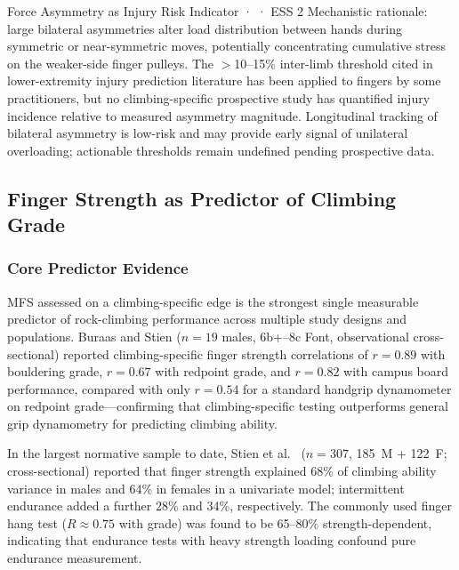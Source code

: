 \begin{bioplausbox}{Force Asymmetry as Injury Risk Indicator · \bioplausible · ESS 2}
Mechanistic rationale: large bilateral asymmetries alter load distribution between hands during symmetric or near-symmetric moves, potentially concentrating cumulative stress on the weaker-side finger pulleys.
The $>$10--15\% inter-limb threshold cited in lower-extremity injury prediction literature has been applied to fingers by some practitioners, but no climbing-specific prospective study has quantified injury incidence relative to measured asymmetry magnitude.
Longitudinal tracking of bilateral asymmetry is low-risk and may provide early signal of unilateral overloading; actionable thresholds remain undefined pending prospective data.
\end{bioplausbox}

\subsection{Finger Strength as Predictor of Climbing Grade}
\label{sec:mfspredictor}

\subsubsection{Core Predictor Evidence}

MFS assessed on a climbing-specific edge is the strongest single measurable predictor of rock-climbing performance across multiple study designs and populations. Buraas and Stien \cite{BBW25} ($n = 19$ males, 6b+--8c Font, observational cross-sectional) reported climbing-specific finger strength correlations of $r = 0.89$ with bouldering grade, $r = 0.67$ with redpoint grade, and $r = 0.82$ with campus board performance, compared with only $r = 0.54$ for a standard handgrip dynamometer on redpoint grade---confirming that climbing-specific testing outperforms general grip dynamometry for predicting climbing ability.

In the largest normative sample to date, Stien et al.\ \cite{BMK+25} ($n = 307$, 185~M + 122~F; cross-sectional) reported that finger strength explained 68\% of climbing ability variance in males and 64\% in females in a univariate model; intermittent endurance added a further 28\% and 34\%, respectively. The commonly used finger hang test ($R \approx 0.75$ with grade) was found to be 65--80\% strength-dependent, indicating that endurance tests with heavy strength loading confound pure endurance measurement.

